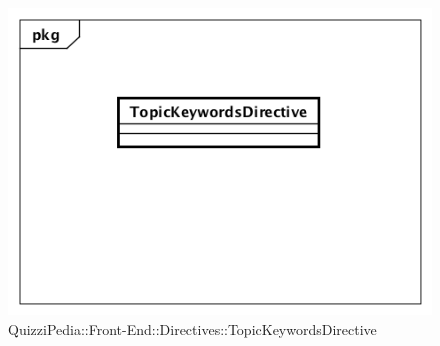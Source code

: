 \label{QuizziPedia::Front-End::Directives::TopicKeywordsDirective}

\begin{figure}[h]
	\centering
	\includegraphics[scale=0.5,keepaspectratio]{UML/Classi/Front-End/QuizziPedia_Front-end_Directives_TopicKeywordsDirective.png}
	\caption{QuizziPedia::Front-End::Directives::TopicKeywordsDirective}
\end{figure}

